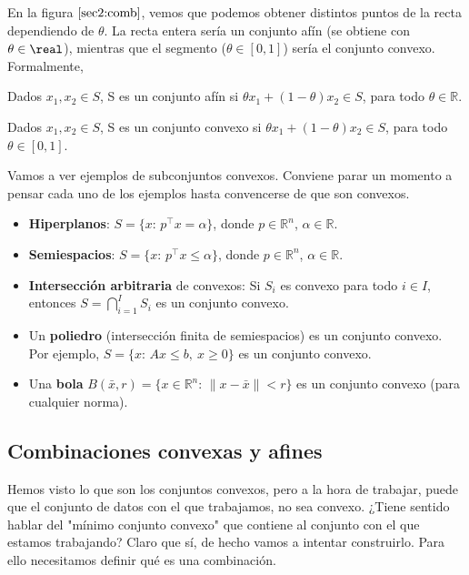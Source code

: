 En la figura $\ref{sec2:comb}$, vemos que podemos obtener distintos puntos de la recta dependiendo de $\theta$. La recta entera sería un conjunto afín (se obtiene con $\theta \in \real$), mientras que el segmento ($\theta \in [0,1]$) sería el conjunto convexo. Formalmente,

\begin{defn}
Dados $x_1,x_2\in S$, S es un conjunto afín si $\theta x_1 + (1-\theta)x_2\in S$, para todo $\theta\in \mathbb{R}$.
\end{defn}

\begin{defn}
Dados $x_1,x_2\in S$, S es un conjunto convexo si $\theta x_1 + (1-\theta)x_2\in S$, para todo $\theta\in [0,1]$.
\end{defn}



Vamos a ver ejemplos de subconjuntos convexos. Conviene parar un momento a pensar cada uno de los ejemplos hasta convencerse de que son convexos.
\begin{itemize}
\item \textbf{Hiperplanos}: $S=\{x:\, p^\top x = \alpha\}$, donde $p\in\mathbb{R}^n$, $\alpha\in\mathbb{R}$.

\item \textbf{Semiespacios}: $S=\{x:\, p^\top x \leq \alpha\}$, donde $p\in\mathbb{R}^n$, $\alpha\in\mathbb{R}$.

\item \textbf{Intersección arbitraria} de convexos: Si $S_i$ es convexo para todo $i\in I$, entonces $S=\bigcap_{i=1}^I S_i$ es un conjunto convexo.

\item Un \textbf{poliedro} (intersección finita de semiespacios) es un conjunto convexo. Por ejemplo, $S=\{x:\, Ax\leq b,\ x\geq 0\}$ es un conjunto convexo.

\item Una \textbf{bola} $B(\bar x,r)=\{x\in\mathbb{R}^n:\, \|x-\bar x\|<r\}$ es un conjunto convexo (para cualquier norma).

\end{itemize}



\subsection{Combinaciones convexas y afines}

Hemos visto lo que son los conjuntos convexos, pero a la hora de trabajar, puede que el conjunto de datos con el que trabajamos, no sea convexo. ¿Tiene sentido hablar del "mínimo conjunto convexo" que contiene al conjunto con el que estamos trabajando?  Claro que sí, de hecho vamos a intentar construirlo. Para ello necesitamos definir qué es una combinación.

